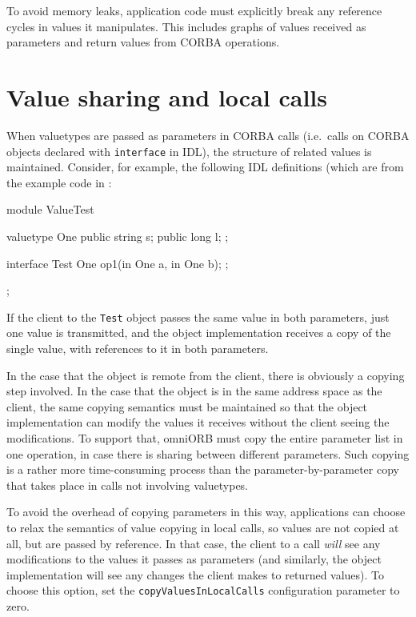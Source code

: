 \documentclass[11pt,twoside,a4paper]{book}
\newcommand{\type}[1]{\texttt{#1}}
\newcommand{\code}[1]{\texttt{#1}}
\newcommand{\file}{\begingroup \urlstyle{tt}\Url}
\begin{document}
To avoid memory leaks, application code must explicitly break any
reference cycles in values it manipulates. This includes graphs of
values received as parameters and return values from CORBA operations.


\section{Value sharing and local calls}

When valuetypes are passed as parameters in CORBA calls (i.e.\ calls
on CORBA objects declared with \code{interface} in IDL), the structure
of related values is maintained. Consider, for example, the following
IDL definitions (which are from the example code in
\file{src/examples/valuetype/simple}:

\begin{idllisting}
module ValueTest {
  valuetype One {
    public string s;
    public long   l;
  };

  interface Test {
    One op1(in One a, in One b);
  };
};
\end{idllisting}

If the client to the \type{Test} object passes the same value in both
parameters, just one value is transmitted, and the object
implementation receives a copy of the single value, with references to
it in both parameters.

In the case that the object is remote from the client, there is
obviously a copying step involved. In the case that the object is in
the same address space as the client, the same copying semantics must
be maintained so that the object implementation can modify the values
it receives without the client seeing the modifications. To support
that, omniORB must copy the entire parameter list in one operation, in
case there is sharing between different parameters. Such copying is a
rather more time-consuming process than the parameter-by-parameter
copy that takes place in calls not involving valuetypes.

To avoid the overhead of copying parameters in this way, applications
can choose to relax the semantics of value copying in local calls, so
values are not copied at all, but are passed by reference. In that
case, the client to a call \emph{will} see any modifications to the
values it passes as parameters (and similarly, the object
implementation will see any changes the client makes to returned
values). To choose this option, set the \code{copyValuesInLocalCalls}
configuration parameter to zero.
\end{document}
